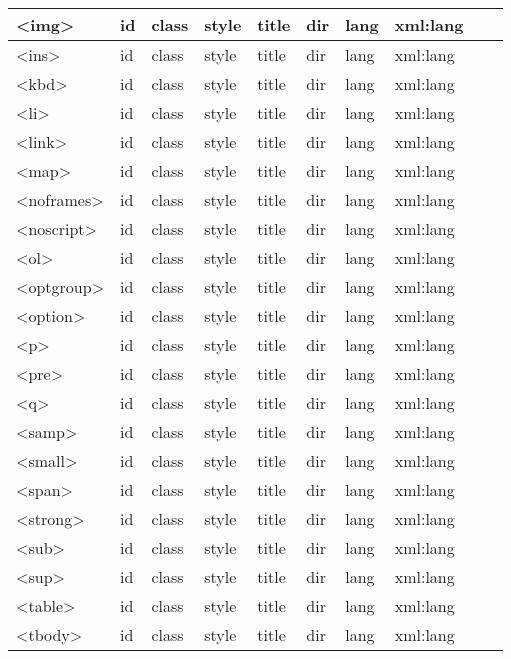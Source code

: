 \begin{longtable}{|l|l|l|l|l|l|l|l|l|l|}
\hline
<img>		&	id &	class &	style &	title & dir & 	lang	& xml:lang & 			&		 \\
\hline
<ins>		&	id &	class &	style &	title & dir & 	lang	& xml:lang & 			&		 \\
\hline
<kbd>		&	id &	class &	style &	title & dir & 	lang	& xml:lang & 			&		 \\
\hline
<li>			&	id &	class &	style &	title & dir & 	lang	& xml:lang & 			&		 \\
\hline
<link>		&	id &	class &	style &	title & dir & 	lang	& xml:lang & 			&		 \\
\hline
<map>		&	id &	class &	style &	title & dir & 	lang	& xml:lang & 			&		 \\
\hline
<noframes>	&	id &	class &	style &	title & dir & 	lang	& xml:lang & 			&		 \\
\hline
<noscript>	&	id &	class &	style &	title & dir & 	lang	& xml:lang & 			&		 \\
\hline
<ol>			&	id &	class &	style &	title & dir & 	lang	& xml:lang & 			&		 \\
\hline
<optgroup>	&	id &	class &	style &	title & dir & 	lang	& xml:lang & 			&		 \\
\hline
<option>		&	id &	class &	style &	title & dir & 	lang	& xml:lang & 			&		 \\
\hline
<p>			&	id &	class &	style &	title & dir & 	lang	& xml:lang & 			&		 \\
\hline
<pre>		&	id &	class &	style &	title & dir & 	lang	& xml:lang & 			&		 \\
\hline
<q>			&	id &	class &	style &	title & dir & 	lang	& xml:lang & 			&		 \\
\hline
<samp>		&	id &	class &	style &	title & dir & 	lang	& xml:lang & 			&		 \\
\hline
<small>		&	id &	class &	style &	title & dir & 	lang	& xml:lang & 			&		 \\
\hline
<span>		&	id &	class &	style &	title & dir & 	lang	& xml:lang & 			&		 \\
\hline
<strong>		&	id &	class &	style &	title & dir & 	lang	& xml:lang & 			&		 \\
\hline
<sub>		&	id &	class &	style &	title & dir & 	lang	& xml:lang & 			&		 \\
\hline
<sup>		&	id &	class &	style &	title & dir & 	lang	& xml:lang & 			&		 \\
\hline
<table>		&	id &	class &	style &	title & dir & 	lang	& xml:lang & 			&		 \\
\hline
<tbody>		&	id &	class &	style &	title & dir & 	lang	& xml:lang & 			&		 \\

\end{longtable}
